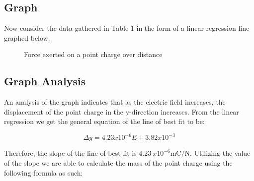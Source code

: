 \documentclass[12pt]{article}
\begin{document}
\subsection{Graph}
Now consider the data gathered in Table 1 in the form of a linear regression line graphed below.

\begin{figure}[H]
    \centering

    \caption[10pt]{Force exerted on a point charge over distance}

\end{figure}

\subsection{Graph Analysis}
An analysis of the graph indicates that as the electric field increases, the displacement of the point charge in the y-direction increases. From the linear regression we get the general equation of the line of best fit to be:

\begin{equation} \label{eq1}
    \Delta y=4.23x10^{-6}E + 3.82x10^{-3}
\end{equation}

Therefore, the slope of the line of best fit is $\SI{4.23}{x10^{-6}\metre\coulomb\per\newton}$. Utilizing the value of the slope we are able to calculate the mass of the point charge using the following formula as such:
\end{document}
